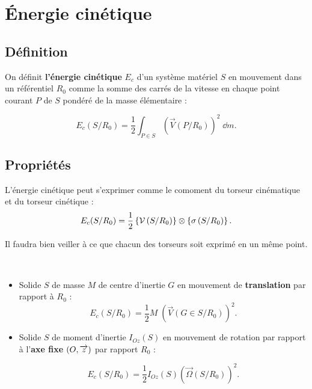 \documentclass[10pt,fleqn]{article} %
\begin{document}
\section{Énergie cinétique}
\subsection{Définition}
\begin{defi}
On définit \textbf{l'énergie cinétique} $E_c$ d'un système matériel $S$ en mouvement dans un référentiel $R_0$ comme la somme des carrés de la vitesse en chaque point courant $P$ de $S$ pondéré de la masse élémentaire :

$$
E_c(S/R_0)=\frac{1}{2}\displaystyle{\int_{P\in S}} \left(\overrightarrow{V}(P/R_0)\right)^2\;\dd m.
$$

\end{defi}

\subsection{Propriétés}

\begin{prop}
L'énergie cinétique peut s'exprimer comme le comoment du torseur cinématique et du torseur cinétique :
$$E_c(S/R_0)=\frac{1}{2}\left\{\mathcal{V} \left(S/R_0 \right) \right\}\otimes \left\{\sigma \left(S/R_0 \right) \right\}.
$$
\end{prop}

\begin{warn}
Il faudra bien veiller à ce que chacun des torseurs soit exprimé en un même point.
\end{warn}

\begin{prop} ~\\

\begin{itemize}
\item Solide $S$ de masse $M$ de centre d'inertie $G$ en mouvement de \textbf{translation} par rapport à $R_0$ :
$$
E_c(S/R_0)=\frac{1}{2}M\;\left(\overrightarrow{V}(G\in S/R_0)\right)^2.
$$

\item Solide $S$ de moment d'inertie $I_{Oz}(S)$ en mouvement de rotation par rapport à l'\textbf{axe fixe} $\left(O,\overrightarrow{{z}}\right)$ par rapport $R_0$ :

$$
E_c(S/R_0)=\frac{1}{2}I_{Oz}(S)\left(\overrightarrow{\Omega}(S/R_0)\right)^2.
$$

\end{itemize}
\end{prop}
\end{document}
